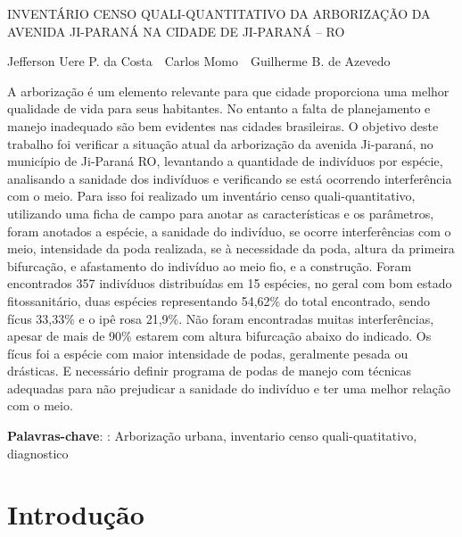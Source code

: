 \documentclass[article,12pt,onesidea,4paper,english,brazil]{abntex2}
\begin{document}
	
	
	\frenchspacing 
	
	\begin{center}
		\LARGE INVENTÁRIO CENSO QUALI-QUANTITATIVO DA ARBORIZAÇÃO DA AVENIDA JI-PARANÁ NA CIDADE DE JI-PARANÁ -- RO
		
		\normalsize
	Jefferson Uere P. da Costa \,\,
	Carlos Momo \,\,
	Guilherme B. de Azevedo \,\,
	\end{center}
	
	\begin{resumoumacoluna}
		A arborização é um elemento relevante para que cidade proporciona uma melhor qualidade de vida para seus habitantes. No entanto a falta de planejamento e manejo inadequado são bem evidentes nas cidades brasileiras. O objetivo deste trabalho foi verificar a situação atual da arborização da avenida Ji-paraná, no município de Ji-Paraná RO, levantando a quantidade de indivíduos por espécie, analisando a sanidade dos indivíduos e verificando se está ocorrendo interferência com o meio. Para isso foi realizado um inventário censo quali-quantitativo, utilizando uma ficha de campo para anotar as características e os parâmetros, foram anotados a espécie, a sanidade do indivíduo, se ocorre interferências com o meio, intensidade da poda realizada, se à necessidade da poda, altura da primeira bifurcação, e afastamento do indivíduo ao meio fio, e a construção. Foram encontrados 357 indivíduos distribuídas em 15 espécies, no geral com bom estado fitossanitário, duas espécies representando 54,62\% do total encontrado, sendo fícus 33,33\% e o ipê rosa 21,9\%. Não foram encontradas muitas interferências, apesar de mais de 90\% estarem com altura bifurcação abaixo do indicado. Os fícus foi a espécie com maior intensidade de podas, geralmente pesada ou drásticas. E necessário definir programa de podas de manejo com técnicas adequadas para não prejudicar a sanidade do indivíduo e ter uma melhor relação com o meio.
		
		\vspace{\onelineskip}
		
		\noindent
		\textbf{Palavras-chave}: : Arborização urbana, inventario censo quali-quatitativo, diagnostico
	\end{resumoumacoluna}
	
	\section*{Introdução}
	
\end{document}

